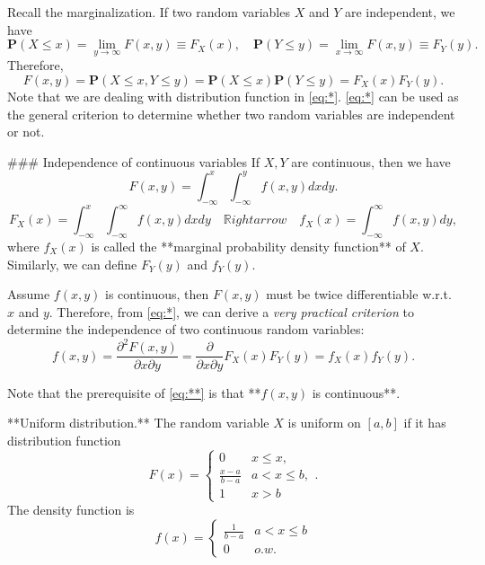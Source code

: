 Recall the marginalization. If two random variables $X$ and $Y$ are independent, we have
\begin{equation*}
    \mathbf{P}(X\leq x) = \lim_{y\to\infty}F(x, y) \equiv F_X(x), \quad 
    \mathbf{P}(Y \leq y) = \lim_{x\to\infty}F(x, y) \equiv F_Y(y).
\end{equation*}
Therefore,
\begin{equation}
    \label{eq:*}
    \tag{*}
    F(x,y) = \mathbf{P}(X \leq x, Y \leq y) = \mathbf{P}(X\leq x) \mathbf{P}(Y \leq y) = F_X(x) F_Y(y). 
\end{equation}
Note that we are dealing with distribution function in \eqref{eq:*}. \eqref{eq:*} can be used as the general criterion to determine whether two random variables are independent or not.

### Independence of continuous variables
If $X, Y$ are continuous, then we have
\begin{equation*}
    F(x, y) = \int_{-\infty}^x \int_{-\infty}^y f(x,y) dx dy.
\end{equation*}
\begin{equation*}
    F_X(x) = \int_{-\infty}^x \int_{-\infty}^\infty f(x, y)dx dy \quad \mathbb{R}ightarrow \quad f_X(x) = \int_{-\infty}^\infty f(x,y)dy,
\end{equation*}
where $f_X(x)$ is called the **marginal probability density function** of $X$. Similarly, we can define $F_Y(y)$ and $f_Y(y)$.

Assume $f(x,y)$ is continuous, then $F(x,y)$ must be twice differentiable w.r.t. $x$ and $y$. Therefore, from \eqref{eq:*}, we can derive a \emph{very practical criterion} to determine the independence of two continuous random variables:
\begin{equation}
    \label{eq:**}
    \tag{**}
    f(x,y) = \frac{\partial^2 F(x,y)}{\partial x \partial y} = \frac{\partial}{\partial x \partial y} F_X(x) F_Y(y) = f_X(x) f_Y(y).
\end{equation}

\begin{remark}
Note that the prerequisite of \eqref{eq:**} is that **$f(x,y)$ is continuous**.
\end{remark}

\begin{example}
**Uniform distribution.** The random variable $X$ is uniform on $[a, b]$ if it has distribution function
\begin{equation*}
    F(x) = \begin{cases} 
        0 & x \leq x, \\ \frac{x-a}{b-a} & a < x \leq b, \\ 1 & x > b
    \end{cases}.
\end{equation*}
The density function is
\begin{equation*}
    f(x) = \begin{cases} \frac{1}{b-a} & a < x \leq b \\ 0 & o.w. \end{cases}
\end{equation*}
\end{example}

